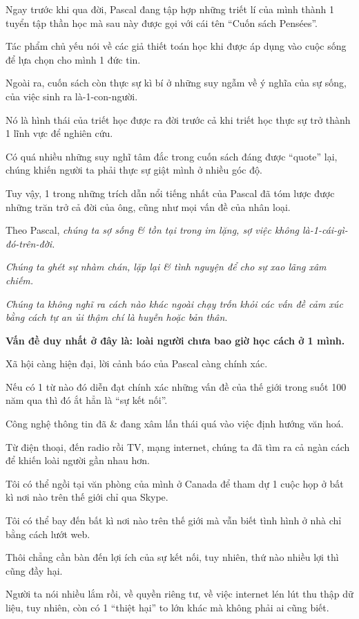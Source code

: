 \documentclass{article}
\begin{document}
%
Ngay trước khi qua đời, Pascal đang tập hợp những triết lí của mình thành 1 tuyển tập thần học mà sau này được gọi với cái tên ``Cuốn sách Pensées''.

Tác phẩm chủ yếu nói về các giả thiết toán học khi được áp dụng vào cuộc sống để lựa chọn cho mình 1 đức tin.

Ngoài ra, cuốn sách còn thực sự kì bí ở những suy ngẫm về ý nghĩa của sự sống, của việc sinh ra là-1-con-người.

Nó là hình thái của triết học được ra đời trước cả khi triết học thực sự trở thành 1 lĩnh vực để nghiên cứu.

%
Có quá nhiều những suy nghĩ tâm đắc trong cuốn sách đáng được ``quote'' lại, chúng khiến người ta phải thực sự giật mình ở nhiều góc độ.

Tuy vậy, 1 trong những trích dẫn nổi tiếng nhất của Pascal đã tóm lược được những trăn trở cả đời của ông, cũng như mọi vấn đề của nhân loại.

%
Theo Pascal, \textit{chúng ta sợ sống \& tồn tại trong im lặng, sợ việc không là-1-cái-gì-đó-trên-đời.}

\textit{Chúng ta ghét sự nhàm chán, lặp lại \& tình nguyện để cho sự xao lãng xâm chiếm.}

\textit{Chúng ta không nghĩ ra cách nào khác ngoài chạy trốn khỏi các vấn đề cảm xúc bằng cách tự an ủi thậm chí là huyễn hoặc bản thân}.

%
\textbf{Vấn đề duy nhất ở đây là: loài người chưa bao giờ học cách ở 1 mình.}

%
Xã hội càng hiện đại, lời cảnh báo của Pascal càng chính xác.

Nếu có 1 từ nào đó diễn đạt chính xác những vấn đề của thế giới trong suốt 100 năm qua thì đó ắt hẳn là ``sự kết nối''.

%
Công nghệ thông tin đã \& đang xâm lấn thái quá vào việc định hướng văn hoá.

Từ điện thoại, đến radio rồi TV, mạng internet, chúng ta đã tìm ra cả ngàn cách để khiến loài người gần nhau hơn.

Tôi có thể ngồi tại văn phòng của mình ở Canada để tham dự 1 cuộc họp ở bất kì nơi nào trên thế giới chỉ qua Skype.

Tôi có thể bay đến bất kì nơi nào trên thế giới mà vẫn biết tình hình ở nhà chỉ bằng cách lướt web.

Thôi chẳng cần bàn đến lợi ích của sự kết nối, tuy nhiên, thứ nào nhiều lợi thì cũng đầy hại.

Người ta nói nhiều lắm rồi, về quyền riêng tư, về việc internet lén lút thu thập dữ liệu, tuy nhiên, còn có 1 ``thiệt hại'' to lớn khác mà không phải ai cũng biết.
\end{document}
